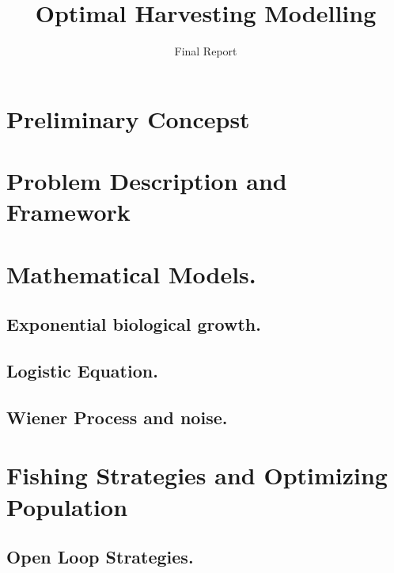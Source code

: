 \documentclass[twoside,colorback,accentcolor=tud4c,11pt]{tudreport}
\title{Optimal Harvesting Modelling}
\subtitle{Final Report}
\begin{document}
\maketitle
	

\tableofcontents
\chapter{Preliminary Concepst} \label{chap:Preliminary}

\chapter{Problem Description and Framework}\label{chap:Problem Framework}
\graphicspath{{ProblemFramework/}}

\chapter{Mathematical Models.} \label{chap: Deterministic Model}
	
	\section{Exponential biological growth.}
		\graphicspath{{Model/ExponentialGrowth/}}
		
	\section{Logistic Equation.}
		\graphicspath{{Model/LogisticEquation/}}
		
	\section{Wiener Process and noise.} 
		\graphicspath{{Model/WienerProcess/}}
		
\chapter{Fishing Strategies and Optimizing Population} \label{chap: Fishing Strategies}
	
	\section{Open Loop Strategies.}
	\graphicspath{{FishingStrategies/OpenLoop/}{FishingStrategies/OpenLoop/ConstantHarvest/}{FishingStrategies/OpenLoop/TimeHarvesting/}{FishingStrategies/OpenLoop/OptimalControl/}}
	
\end{document}
